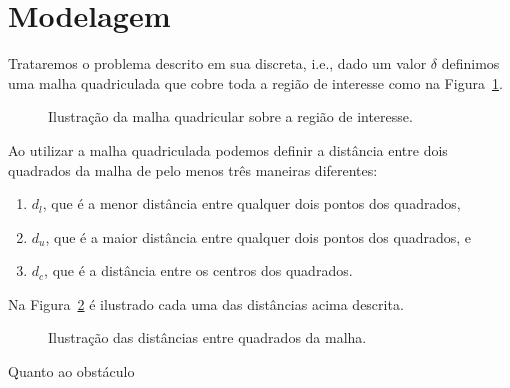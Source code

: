 \section{Modelagem}
Trataremos o problema descrito em sua discreta, i.e., dado um valor $\delta$ definimos uma malha quadriculada que cobre toda a regi\~{a}o de interesse como na Figura~\ref{fig:malha_quad}.
\begin{figure}[!htb]
    \centering
    \caption{Ilustra\c{c}\~{a}o da malha quadricular sobre a regi\~{a}o de interesse.}
    \label{fig:malha_quad}
\end{figure}

Ao utilizar a malha quadriculada podemos definir a dist\^{a}ncia entre dois quadrados da malha de pelo menos tr\^{e}s maneiras diferentes:
\begin{enumerate}
    \item $d_l$, que \'{e} a menor dist\^{a}ncia entre qualquer dois pontos dos quadrados,
    \item $d_u$, que \'{e} a maior dist\^{a}ncia entre qualquer dois pontos dos quadrados, e
    \item $d_c$, que \'{e} a dist\^{a}ncia entre os centros dos quadrados.
\end{enumerate}
Na Figura~\ref{fig:dist_malha} \'{e} ilustrado cada uma das dist\^{a}ncias acima descrita.
\begin{figure}[!htb]
    \centering
    \caption{Ilustra\c{c}\~{a}o das dist\^{a}ncias entre quadrados da malha.}
    \label{fig:dist_malha}
\end{figure}

Quanto ao obst\'{a}culo
